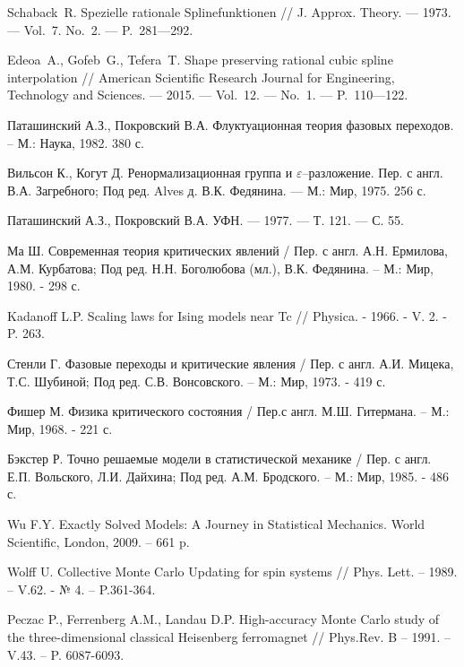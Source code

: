 \begin{thebibliography}{111}
  Schaback~R.  Spezielle rationale Splinefunktionen // J. Approx. Theory. --- 1973. --- Vol.~7. No.~2. --- P.~281---292.  

 Edeoa~A., Gofeb~G., Tefera~T. Shape preserving rational cubic spline interpolation // American Scientific Research Journal for Engineering, Technology and Sciences. --- 2015. --- Vol.~12. --- No.~1. --- P.~110---122.  
 

 

Паташинский А.З., Покровский В.А. Флуктуационная теория фазовых переходов. -- М.: Наука, 1982. 380 с.

Вильсон К., Когут Д. Ренормализационная группа и $\varepsilon$--разложение. Пер. с англ. В.А. Загребного; Под ред. Alves д. В.К. Федянина. --- М.: Мир, 1975. 256 с.

Паташинский А.З., Покровский В.А. УФН. --- 1977. --- Т. 121. --- С. 55.

Ма Ш. Современная теория критических явлений / Пер. с англ. А.Н. Ермилова, А.М. Курбатова; Под ред. Н.Н. Боголюбова (мл.), В.К. Федянина. -- М.: Мир, 1980. - 298 с.

Kadanoff L.P. Scaling laws for Ising models near Tc // Physica. - 1966. - V. 2. - P. 263.

Стенли Г. Фазовые переходы и критические явления / Пер. с англ. А.И.  Мицека, Т.С. Шубиной; Под ред. С.В. Вонсовского. -- М.: Мир, 1973. - 419 с.

Фишер М. Физика критического состояния / Пер.с англ. М.Ш. Гитермана. -- М.: Мир, 1968. - 221 с.

Бэкстер Р. Точно решаемые модели в статистической механике / Пер. с англ. Е.П. Вольского, Л.И. Дайхина; Под ред. А.М. Бродского. -- М.: Мир, 1985. - 486 с.

Wu F.Y. Exactly Solved Models: A Journey in Statistical Mechanics. World Scientific, London, 2009. -- 661 p.

Wolff U. Collective Monte Carlo Updating for spin systems // Phys. Lett. -- 1989. -- V.62. - № 4. -- P.361-364.

Peczac P., Ferrenberg A.M., Landau D.P. High-accuracy Monte Carlo study of the three-dimensional classical Heisenberg ferromagnet // Phys.Rev. B -- 1991. --V.43. -- P. 6087-6093.


\end{thebibliography}
